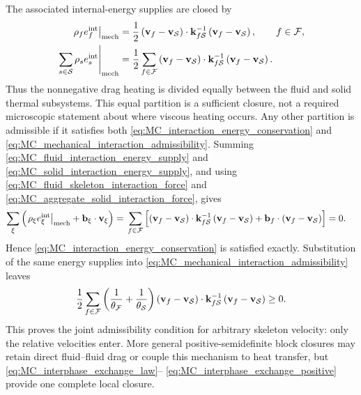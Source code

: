 The associated internal-energy supplies are closed by
%
\begin{subequations}
	\label{eq:MC_drag_heating_equal_partition}
	\begin{align}
		\left.
		\rho_f e_f^{\rm int}
		\right\vert_{\rm mech}
		={}&
		\frac{1}{2}
		\left(
			\mathbf{v}_f-\mathbf{v}_{\mathcal{S}}
		\right)\cdot
		\mathbf{k}_{f\mathcal{S}}^{-1}
		\left(
			\mathbf{v}_f-\mathbf{v}_{\mathcal{S}}
		\right),
		\qquad
		f\in\mathcal{F},
		\label{eq:MC_fluid_interaction_energy_supply}
		\\
		\left.
		\sum_{s\in\mathcal{S}}
		\rho_s e_s^{\rm int}
		\right\vert_{\rm mech}
		={}&
		\frac{1}{2}
		\sum_{f\in\mathcal{F}}
		\left(
			\mathbf{v}_f-\mathbf{v}_{\mathcal{S}}
		\right)\cdot
		\mathbf{k}_{f\mathcal{S}}^{-1}
		\left(
			\mathbf{v}_f-\mathbf{v}_{\mathcal{S}}
		\right).
		\label{eq:MC_solid_interaction_energy_supply}
	\end{align}
\end{subequations}
%
Thus the nonnegative drag heating is divided equally between the fluid and solid
thermal subsystems.  This equal partition is a sufficient closure, not a
required microscopic statement about where viscous heating occurs.  Any other
partition is admissible if it satisfies both
\eqref{eq:MC_interaction_energy_conservation} and
\eqref{eq:MC_mechanical_interaction_admissibility}.  Summing
\eqref{eq:MC_fluid_interaction_energy_supply} and
\eqref{eq:MC_solid_interaction_energy_supply}, and using
\eqref{eq:MC_fluid_skeleton_interaction_force} and
\eqref{eq:MC_aggregate_solid_interaction_force}, gives
%
\begin{align}
	\sum_\xi
	\left(
		\left.
		\rho_\xi e_\xi^{\rm int}
		\right\vert_{\rm mech}
		+
		\mathbf{b}_\xi\cdot\mathbf{v}_\xi
	\right)
	={}&
	\sum_{f\in\mathcal{F}}
	\left[
		\left(
			\mathbf{v}_f-\mathbf{v}_{\mathcal{S}}
		\right)\cdot
		\mathbf{k}_{f\mathcal{S}}^{-1}
		\left(
			\mathbf{v}_f-\mathbf{v}_{\mathcal{S}}
		\right)
		+
		\mathbf{b}_f\cdot
		\left(
			\mathbf{v}_f-\mathbf{v}_{\mathcal{S}}
			\right)
	\right]
	=0 .
	\label{eq:MC_fluid_skeleton_interaction_energy_verification}
\end{align}
%
Hence \eqref{eq:MC_interaction_energy_conservation} is satisfied exactly.
Substitution of the same energy supplies into
\eqref{eq:MC_mechanical_interaction_admissibility} leaves
%
\begin{equation}
	\frac{1}{2}
	\sum_{f\in\mathcal{F}}
	\left(
		\frac{1}{\theta_{\mathcal{F}}}
		+
		\frac{1}{\theta_{\mathcal{S}}}
	\right)
	\left(
		\mathbf{v}_f-\mathbf{v}_{\mathcal{S}}
	\right)\cdot
	\mathbf{k}_{f\mathcal{S}}^{-1}
	\left(
		\mathbf{v}_f-\mathbf{v}_{\mathcal{S}}
	\right)
	\ge0 .
	\label{eq:MC_interphase_exchange_positive}
\end{equation}
%
This proves the joint admissibility condition for arbitrary skeleton velocity:
only the relative velocities enter.  More general positive-semidefinite block
closures may retain direct fluid--fluid drag or couple this mechanism to heat
transfer, but \eqref{eq:MC_interphase_exchange_law}--
\eqref{eq:MC_interphase_exchange_positive} provide one complete local closure.

